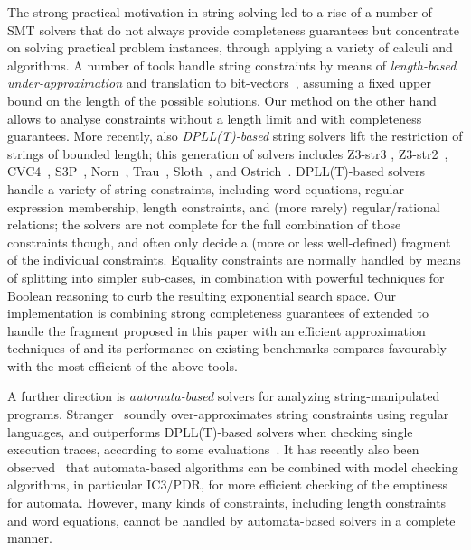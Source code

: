 \documentclass[sigplan,review,anonymous]{acmart}\settopmatter{printfolios=true,printccs=false,printacmref=false}
\begin{document}
The strong practical motivation in string solving led to a rise of a number of SMT solvers that do not always provide completeness guarantees but concentrate on solving practical problem instances, 
through applying a variety of calculi and algorithms.
%
A number of tools handle string constraints by means of {\it length-based under-approximation} and
translation to
bit-vectors~\cite{kiezun2009hampi,saxena2010symbolic,saxena2010flax}, assuming
a fixed upper bound on the length of the possible solutions. 
%
Our method on the other hand allows to analyse constraints without a length limit and with completeness guarantees.
%
More recently, also {\it DPLL(T)-based} string solvers lift the
restriction of strings of bounded length; this generation of solvers
includes Z3-str3 \cite{berzish2017z3str3}, Z3-str2~\cite{zheng2017z3str2}, 
CVC4~\cite{cvc4Tool}, S3P~\cite{trinh2014s3,trinh2016progressive},
Norn~\cite{abdulla2015norn}, 
Trau~\cite{abdulla2018trau}, 
Sloth~\cite{sloth}, 
and 
Ostrich~\cite{chen2019decision}. DPLL(T)-based solvers
handle a variety of string constraints, including word equations, regular expression membership, length constraints, and (more rarely)
regular/rational relations; the solvers are not complete for the full
combination of those constraints though, and often only decide a (more
or less well-defined) fragment of the individual constraints. 
Equality constraints are normally handled by means of splitting into simpler
sub-cases, in combination with powerful techniques for Boolean
reasoning to curb the resulting exponential search space. 
%
Our implementation is combining strong completeness guarantees of \cite{sloth} extended to handle the fragment proposed in this paper with an efficient approximation techniques of \cite{abdulla2018trau} 
and its performance on existing benchmarks compares favourably with the most efficient of the above tools.
%

A further direction is {\it automata-based} solvers for analyzing
string-manipulated programs. Stranger~\cite{yu2010stranger} soundly
over-approximates string constraints using regular languages, and
outperforms DPLL(T)-based solvers when checking single execution
traces, according to some evaluations~\cite{kausler2014evaluation}. It has
recently also been observed~\cite{wang2016string,sloth} that
automata-based algorithms can be combined with model checking
algorithms, in particular IC3/PDR, for more efficient checking of the emptiness for automata. However, many kinds of constraints, including length
constraints and word equations, cannot be
handled by automata-based solvers in a complete manner. 








\end{document}
